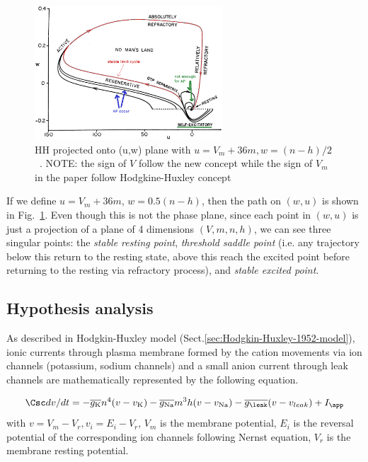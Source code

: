 


\begin{figure}[hbt]
  \centerline{\includegraphics[height=5cm,
    angle=0]{./images/HH_phaseplane.eps}}
  \caption{HH projected onto (u,w) plane with $u=V_m+36m, w=(n-h)/2$
    ~\citep{fitzhugh1961ips}. NOTE: the sign of $V$ follow the new
    concept while the sign of $V_m$ in the paper follow
    Hodgkine-Huxley concept}
\label{fig:HH_phasespace}
\end{figure}

If we define $u=V_m+36m$, $w=0.5(n-h)$, then the path on $(w,u)$ is shown
in Fig.~\ref{fig:HH_phasespace}. Even though this is not the phase plane, since
each point in $(w,u)$ is just a projection of a plane of 4 dimensions
$(V,m,n,h)$, we can see three singular points: the {\it stable resting point},
{\it threshold saddle point} (i.e. any trajectory below this return to the
resting state, above this reach the excited point before returning to the
resting via refractory process), and {\it stable excited point}.



\subsection{Hypothesis analysis}

As described in Hodgkin-Huxley model (Sect.\ref{sec:Hodgkin-Huxley-1952-model}),
ionic currents through plasma membrane formed by the cation movements via ion
channels (potassium, sodium channels) and a small anion current through leak
channels are mathematically represented by the following equation.

\begin{equation}
  \label{eq:286}
     \Csc dv/dt = - \overline{g_{\ce{K}}}n^4(v-v_{\ce{K}}) - \overline{g_{\ce{Na}}}
    m^3h(v-v_{\ce{Na}}) - \overline{g_{\leak}} (v-v_{leak}) + I_\app
\end{equation}
with $v=V_m-V_r, v_i=E_i-V_r$, $V_m$ is the membrane potential, $E_i$
is the reversal potential of the corresponding ion channels following
Nernst equation, $V_r$ is the membrane resting potential.


